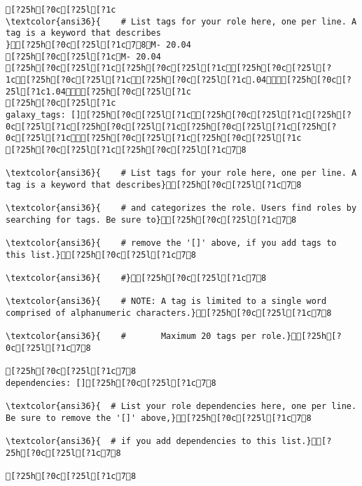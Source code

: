 \documentclass{scrartcl}
\begin{document}
\begin{Verbatim}
[?25h[?0c[?25l[?1c
\textcolor{ansi36}{    # List tags for your role here, one per line. A tag is a keyword that describes
}[?25h[?0c[?25l[?1c78M- 20.04
[?25h[?0c[?25l[?1cM- 20.04
[?25h[?0c[?25l[?1c[?25h[?0c[?25l[?1c[?25h[?0c[?25l[?1c[?25h[?0c[?25l[?1c[?25h[?0c[?25l[?1c.04[?25h[?0c[?25l[?1c1.04[?25h[?0c[?25l[?1c
[?25h[?0c[?25l[?1c
galaxy_tags: [][?25h[?0c[?25l[?1c[?25h[?0c[?25l[?1c[?25h[?0c[?25l[?1c[?25h[?0c[?25l[?1c[?25h[?0c[?25l[?1c[?25h[?0c[?25l[?1c[?25h[?0c[?25l[?1c[?25h[?0c[?25l[?1c
[?25h[?0c[?25l[?1c[?25h[?0c[?25l[?1c78

\textcolor{ansi36}{    # List tags for your role here, one per line. A tag is a keyword that describes}[?25h[?0c[?25l[?1c78

\textcolor{ansi36}{    # and categorizes the role. Users find roles by searching for tags. Be sure to}[?25h[?0c[?25l[?1c78

\textcolor{ansi36}{    # remove the '[]' above, if you add tags to this list.}[?25h[?0c[?25l[?1c78

\textcolor{ansi36}{    #}[?25h[?0c[?25l[?1c78

\textcolor{ansi36}{    # NOTE: A tag is limited to a single word comprised of alphanumeric characters.}[?25h[?0c[?25l[?1c78

\textcolor{ansi36}{    #       Maximum 20 tags per role.}[?25h[?0c[?25l[?1c78

[?25h[?0c[?25l[?1c78
dependencies: [][?25h[?0c[?25l[?1c78

\textcolor{ansi36}{  # List your role dependencies here, one per line. Be sure to remove the '[]' above,}[?25h[?0c[?25l[?1c78

\textcolor{ansi36}{  # if you add dependencies to this list.}[?25h[?0c[?25l[?1c78

[?25h[?0c[?25l[?1c78


\end{Verbatim}
\end{document}
